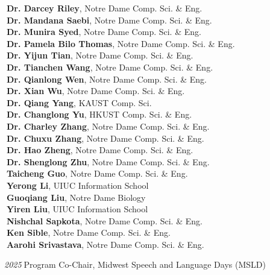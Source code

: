 \documentclass[10pt]{article}
\newenvironment{myindentpar}[1]%
{\begin{list}{}%
         {\setlength{\leftmargin}{#1}}%
         \item[]%
}
{\end{list}}
\newcounter{list}
\begin{document}
\begin{myindentpar}{0.75cm}
{\textcolor{white}{.}{\bf Dr. Darcey Riley}, Notre Dame Comp. Sci. \& Eng. \\
\textcolor{white}{.}{\bf Dr. Mandana Saebi}, Notre Dame Comp. Sci. \& Eng. \\
\textcolor{white}{.}{\bf Dr. Munira Syed}, Notre Dame Comp. Sci. \& Eng. \\
\textcolor{white}{.}{\bf Dr. Pamela Bilo Thomas}, Notre Dame Comp. Sci. \& Eng. \\
\textcolor{white}{.}{\bf Dr. Yijun Tian}, Notre Dame Comp. Sci. \& Eng. \\
\textcolor{white}{.}{\bf Dr. Tianchen Wang}, Notre Dame Comp. Sci. \& Eng. \\
\textcolor{white}{.}{\bf Dr. Qianlong Wen}, Notre Dame Comp. Sci. \& Eng. \\
\textcolor{white}{.}{\bf Dr. Xian Wu}, Notre Dame Comp. Sci. \& Eng. \\
\textcolor{white}{.}{\bf Dr. Qiang Yang}, KAUST Comp. Sci. \\
\textcolor{white}{.}{\bf Dr. Changlong Yu}, HKUST Comp. Sci. \& Eng. \\
\textcolor{white}{.}{\bf Dr. Charley Zhang}, Notre Dame Comp. Sci. \& Eng. \\
\textcolor{white}{.}{\bf Dr. Chuxu Zhang}, Notre Dame Comp. Sci. \& Eng. \\
\textcolor{white}{.}{\bf Dr. Hao Zheng}, Notre Dame Comp. Sci. \& Eng. \\
\textcolor{white}{.}{\bf Dr. Shenglong Zhu}, Notre Dame Comp. Sci. \& Eng. \\
\textcolor{white}{.}{\bf Taicheng Guo}, Notre Dame Comp. Sci. \& Eng. \\
\textcolor{white}{.}{\bf Yerong Li}, UIUC Information School \\
\textcolor{white}{.}{\bf Guoqiang Liu}, Notre Dame Biology \\
\textcolor{white}{.}{\bf Yiren Liu}, UIUC Information School \\
\textcolor{white}{.}{\bf Nishchal Sapkota}, Notre Dame Comp. Sci. \& Eng. \\
\textcolor{white}{.}{\bf Ken Sible}, Notre Dame Comp. Sci. \& Eng. \\
\textcolor{white}{.}{\bf Aarohi Srivastava}, Notre Dame Comp. Sci. \& Eng.

}

\hspace{-0.75cm}{\bf Organizing Committee}

{\small

\hspace{-0.75cm}\textit{2025}\textcolor{white}{.}Program Co-Chair, Midwest Speech and Language Days (MSLD)

}
\end{myindentpar}
\end{document}
